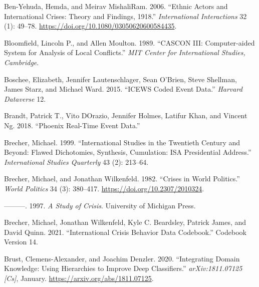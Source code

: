 \documentclass{article}
\newlength{\cslhangindent}
\newlength{\cslentryspacingunit} %
\newenvironment{CSLReferences}[2] %
 {%
  \setlength{\parindent}{0pt}
  \ifodd #1
  \let\oldpar\par
  \def\par{\hangindent=\cslhangindent\oldpar}
  \fi
  \setlength{\parskip}{#2\cslentryspacingunit}
 }%
 {}
\begin{document}
\begin{CSLReferences}{1}{0}
\leavevmode{}%
Ben-Yehuda, Hemda, and Meirav MishaliRam. 2006. {``Ethnic {Actors} and
{International Crises}: {Theory} and {Findings},
1918.''} \emph{International Interactions} 32 (1):
49--78. \url{https://doi.org/10.1080/03050620600584435}.

\leavevmode{}%
Bloomfield, Lincoln P., and Allen Moulton. 1989. {``{CASCON III}:
{Computer-aided} System for Analysis of Local Conflicts.''} \emph{MIT
Center for International Studies, Cambridge}.

\leavevmode{}%
Boschee, Elizabeth, Jennifer Lautenschlager, Sean O'Brien, Steve
Shellman, James Starz, and Michael Ward. 2015. {``{ICEWS} Coded Event
Data.''} \emph{Harvard Dataverse} 12.

\leavevmode{}%
Brandt, Patrick T., Vito DOrazio, Jennifer Holmes, Latifur Khan, and
Vincent Ng. 2018. {``Phoenix {Real-Time Event Data}.''}

\leavevmode{}%
Brecher, Michael. 1999. {``International Studies in the Twentieth
Century and Beyond: {Flawed} Dichotomies, Synthesis, Cumulation: {ISA}
Presidential Address.''} \emph{International Studies Quarterly} 43 (2):
213--64.

\leavevmode{}%
Brecher, Michael, and Jonathan Wilkenfeld. 1982. {``Crises in {World
Politics}.''} \emph{World Politics} 34 (3): 380--417.
\url{https://doi.org/10.2307/2010324}.

\leavevmode{}%
---------. 1997. \emph{A {Study} of {Crisis}}. {University of Michigan
Press}.

\leavevmode{}%
Brecher, Michael, Jonathan Wilkenfeld, Kyle C. Beardsley, Patrick James,
and David Quinn. 2021. {``International {Crisis Behavior Data
Codebook}.''} Codebook Version 14.

\leavevmode{}%
Brust, Clemens-Alexander, and Joachim Denzler. 2020. {``Integrating
Domain Knowledge: Using Hierarchies to Improve Deep Classifiers.''}
\emph{arXiv:1811.07125 {[}Cs{]}}, January.
\url{https://arxiv.org/abs/1811.07125}.


\end{CSLReferences}
\end{document}
